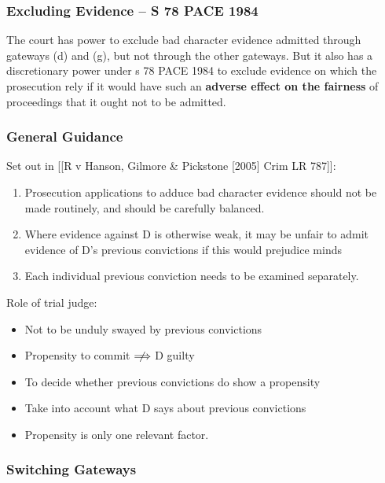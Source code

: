 \documentclass[
]{article}
\providecommand{\tightlist}{%
  \setlength{\itemsep}{0pt}\setlength{\parskip}{0pt}}
\begin{document}
\hypertarget{excluding-evidence-s-78-pace-1984}{%
\subsubsection{Excluding Evidence -- S 78 PACE
1984}\label{excluding-evidence-s-78-pace-1984}}

The court has power to exclude bad character evidence admitted through
gateways (d) and (g), but not through the other gateways. But it also
has a discretionary power under s 78 PACE 1984 to exclude evidence on
which the prosecution rely if it would have such an \textbf{adverse
effect on the fairness} of proceedings that it ought not to be admitted.

\hypertarget{general-guidance}{%
\subsubsection{General Guidance}\label{general-guidance}}

Set out in {[}{[}R v Hanson, Gilmore \& Pickstone {[}2005{]} Crim LR
787{]}{]}:

\begin{enumerate}
\def\labelenumi{\arabic{enumi}.}
\tightlist
\item
  Prosecution applications to adduce bad character evidence should not
  be made routinely, and should be carefully balanced.
\item
  Where evidence against D is otherwise weak, it may be unfair to admit
  evidence of D's previous convictions if this would prejudice minds
\item
  Each individual previous conviction needs to be examined separately.
\end{enumerate}

Role of trial judge:

\begin{itemize}
\tightlist
\item
  Not to be unduly swayed by previous convictions
\item
  Propensity to commit\(\centernot\implies\)D guilty
\item
  To decide whether previous convictions do show a propensity
\item
  Take into account what D says about previous convictions
\item
  Propensity is only one relevant factor.
\end{itemize}

\hypertarget{switching-gateways}{%
\subsubsection{Switching Gateways}\label{switching-gateways}}
\end{document}
